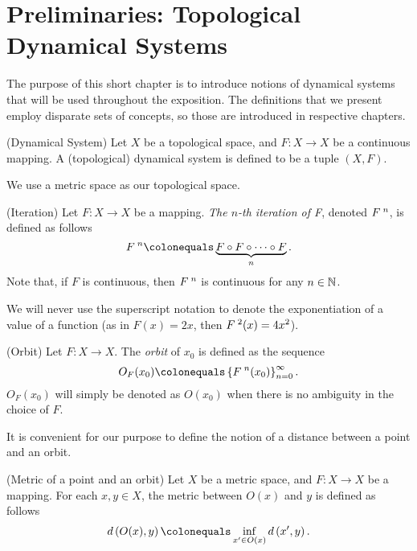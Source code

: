 \documentclass[10pt,twoside,draft]{book}
\begin{document}
\chapter{Preliminaries: Topological Dynamical Systems}
\label{chap:prelim}
The purpose of this short chapter is to introduce notions of dynamical systems that will be used throughout the exposition.
The definitions that we present employ disparate sets of concepts, so those are introduced in respective chapters.

\begin{definition}
  (Dynamical System)
  Let $X$ be a topological space, and $F: X \to X$ be a continuous mapping.
  A (topological) dynamical system is defined to be a tuple $(X, F)$.
\end{definition}
\begin{remark}
  We use a metric space as our topological space.
\end{remark}
%
\begin{definition}
  (Iteration)
  Let $F: X \to X$ be a mapping.
  \textit{The $n$-th iteration of F}, denoted $F^{\;n}$, is defined as follows
  \begin{equation*}
    \itr{F}{n} \ceq \underbrace{F \circ F \circ \cdots \circ F}_{n} .
  \end{equation*}
  Note that, if $F$ is continuous, then $F^{\;n}$ is continuous for any $n \in \mathbb{N}$.
\end{definition}
\begin{remark}
  We will never use the superscript notation to denote the exponentiation of a value of a function (as in $F(x) = 2x$, then $F^{\;2}(x) = 4x^2$).
\end{remark}
\begin{definition}
  (Orbit)
  Let $F: X \to X$. 
  The \textit{orbit} of $x_0$ is defined as the sequence
  \begin{equation*}
    O_F(x_0) \ceq \seq{\itr{F}{n}(x_0)}{\infty}{n = 0}.
  \end{equation*}
  $O_F(x_0)$ will simply be denoted as $O(x_0)$ when there is no ambiguity in the choice of $F$.
  \label{def:orbit}
\end{definition}
It is convenient for our purpose to define the notion of a distance between a point and an orbit.
\begin{definition}
  (Metric of a point and an orbit)
  Let $X$ be a metric space, and $F: X \to X$ be a mapping.
  For each $x,y \in X$, the metric between $O(x)$ and $y$ is defined as follows
  \begin{equation*}
    \metric{O(x),y} \ceq \inf\limits_{x' \in O(x)} \metric{x',y}.
  \end{equation*}
\end{definition}
\end{document}
